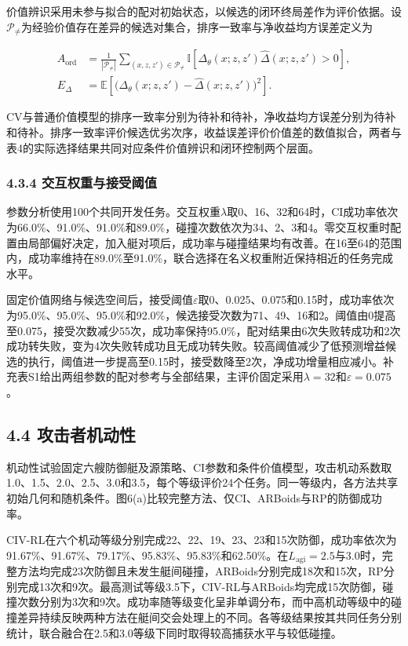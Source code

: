 \documentclass[UTF8,a4paper,zihao=5,fontset=none]{ctexart}
\begin{document}
价值辨识采用未参与拟合的配对初始状态，以候选的闭环终局差作为评价依据。设\(\mathcal P_{\ne}\)为经验价值存在差异的候选对集合，排序一致率与净收益均方误差定义为

\[
\begin{aligned}
A_{\mathrm{ord}}
&=\frac1{|\mathcal P_{\ne}|}
\sum_{(x,z,z')\in\mathcal P_{\ne}}
\mathbb I\!\left[\Delta_\theta(x;z,z')\widehat\Delta(x;z,z')>0\right],\\
E_\Delta&=\mathbb E\!\left[
\bigl(\Delta_\theta(x;z,z')-\widehat\Delta(x;z,z')\bigr)^2\right].
\end{aligned}
\tag{41}
\]

CV与普通价值模型的排序一致率分别为\textcolor{PendingRed}{待补}和\textcolor{PendingRed}{待补}，净收益均方误差分别为\textcolor{PendingRed}{待补}和\textcolor{PendingRed}{待补}。排序一致率评价候选优劣次序，收益误差评价价值差的数值拟合，两者与表4的实际选择结果共同对应条件价值辨识和闭环控制两个层面。

\subsubsection*{4.3.4 交互权重与接受阈值}

参数分析使用100个共同开发任务。交互权重\(\lambda\)取0、16、32和64时，CI成功率依次为66.0\%、91.0\%、91.0\%和89.0\%，碰撞次数依次为34、2、3和4。零交互权重时配置由局部偏好决定，加入艇对项后，成功率与碰撞结果均有改善。在16至64的范围内，成功率维持在89.0\%至91.0\%，联合选择在名义权重附近保持相近的任务完成水平。

固定价值网络与候选空间后，接受阈值\(\varepsilon\)取0、0.025、0.075和0.15时，成功率依次为95.0\%、95.0\%、95.0\%和92.0\%，候选接受次数为71、49、16和2。阈值由0提高至0.075，接受次数减少55次，成功率保持95.0\%，配对结果由6次失败转成功和2次成功转失败，变为4次失败转成功且无成功转失败。较高阈值减少了低预测增益候选的执行，阈值进一步提高至0.15时，接受数降至2次，净成功增量相应减小。补充表S1给出两组参数的配对参考与全部结果，主评价固定采用\(\lambda=32\)和\(\varepsilon=0.075\)。

\subsection*{4.4 攻击者机动性}

机动性试验固定六艘防御艇及源策略、CI参数和条件价值模型，攻击机动系数取1.0、1.5、2.0、2.5、3.0和3.5，每个等级评价24个任务。同一等级内，各方法共享初始几何和随机条件。图6(a)比较完整方法、仅CI、ARBoids与RP的防御成功率。

CIV-RL在六个机动等级分别完成22、22、19、23、23和15次防御，成功率依次为91.67\%、91.67\%、79.17\%、95.83\%、95.83\%和62.50\%。在\(L_{\mathrm{agi}}=2.5\)与3.0时，完整方法均完成23次防御且未发生艇间碰撞，ARBoids分别完成18次和15次，RP分别完成13次和9次。最高测试等级3.5下，CIV-RL与ARBoids均完成15次防御，碰撞次数分别为3次和9次。成功率随等级变化呈非单调分布，而中高机动等级中的碰撞差异持续反映两种方法在艇间交会处理上的不同。各等级结果按其共同任务分别统计，联合融合在2.5和3.0等级下同时取得较高捕获水平与较低碰撞。
\end{document}
